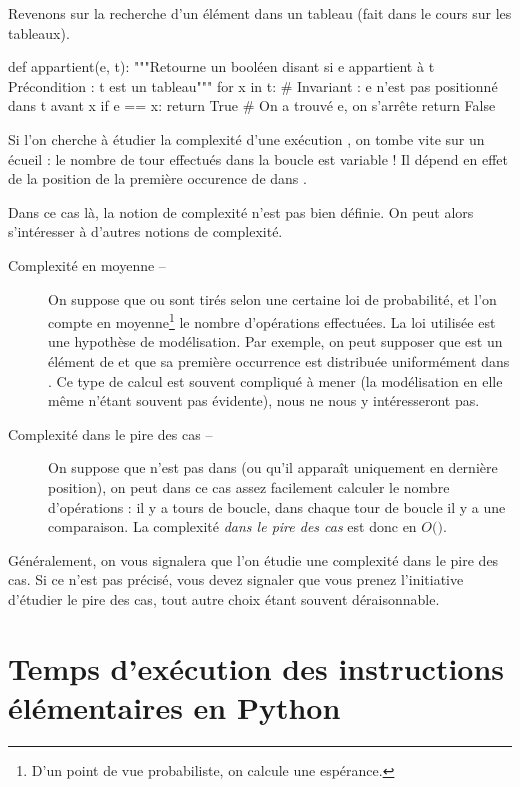 Revenons sur la recherche d'un élément dans un tableau (fait dans le cours sur les tableaux). 

\begin{pyverbatim}
def appartient(e, t):
    """Retourne un booléen disant si e appartient à t
       Précondition : t est un tableau"""
    for x in t:
        # Invariant : e n'est pas positionné dans t avant x
        if e == x:
            return True # On a trouvé e, on s'arrête
    return False
\end{pyverbatim}

Si l'on cherche à étudier la complexité d'une exécution , on tombe vite sur un écueil : le nombre de tour effectués dans la boucle  est variable ! 
Il dépend en effet de la position de la première occurence de  dans . 

Dans ce cas là, la notion de complexité n'est pas bien définie. On peut alors s'intéresser à d'autres notions de complexité. 

\begin{description}
  \item[Complexité en moyenne --] On suppose que  ou  sont tirés selon une certaine loi 
de probabilité, et l'on compte \og en moyenne\footnote{D'un point de vue probabiliste, on calcule une 
espérance.} \fg{} le nombre d'opérations effectuées. 
    La loi utilisée est une hypothèse de modélisation. Par exemple, on peut supposer que  est un élément de  et que sa première occurrence est distribuée uniformément dans . 
    Ce type de calcul est souvent compliqué à mener (la modélisation en elle même n'étant souvent pas évidente), nous ne nous y intéresseront pas. 
  \item[Complexité dans le pire des cas --] On suppose que  n'est pas dans  (ou qu'il apparaît uniquement en dernière position), on peut dans ce cas assez facilement calculer le nombre d'opérations : 
    il y a  tours de boucle, dans chaque tour de boucle il y a une comparaison. La complexité \emph{dans le pire des cas} est donc en $O($$)$.
\end{description}

Généralement, on vous signalera que l'on étudie une complexité dans le pire des cas. Si ce n'est pas précisé, vous devez signaler que vous prenez l'initiative d'étudier le pire des cas, tout autre choix étant souvent déraisonnable. 

\section{Temps d'exécution des instructions élémentaires en Python}

